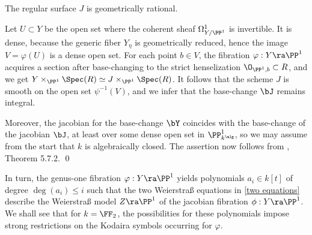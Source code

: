 \begin{proposition}
\notready
\label{jacobian geometrically rational}
The regular surface $J$ is geometrically rational.
\end{proposition}

\proof
Let $U\subset Y$ be the open set where the coherent sheaf $\Omega^1_{Y/\PP^1}$ is invertible.
It is dense, because the generic fiber $Y_\eta$ is geometrically reduced, hence the image
$V=\varphi(U)$ is a dense open set.
For each point $b\in V$, the fibration $\varphi:Y\ra\PP^1$ acquires a section after base-changing
to the strict henselization  $\O_{\PP^1,b}\subset R$, and we get $Y\times_{\PP^1}\Spec(R)\simeq J\times_{\PP^1}\Spec(R)$.
It follows that the scheme $J$ is smooth on the open set $\psi^{-1}(V)$, and we infer that the base-change $\bJ$ remains integral.

Moreover, the jacobian for the base-change $\bY$ coincides with the base-change of the jacobian $\bJ$, at least over some
dense open set in $\PP^1_{k^\alg}$, so we may assume from the start that $k$ is algebraically closed.
The assertion now follows from \cite{Cossec-Dolgachev-1989}, Theorem 5.7.2.
\qed


In turn, the genus-one fibration $\varphi:Y\ra \PP^1$ yields polynomials $a_i\in k[t]$ of degree $\deg(a_i)\leq i$
such that the two Weierstra\ss{} equations in \eqref{two equations} describe the Weierstra\ss{} model $Z\ra \PP^1$
of the jacobian fibration $\phi:Y\ra\PP^1$. We shall see that for $k=\FF_2$, the possibilities for these polynomials
impose
strong restrictions on the Kodaira symbols occurring for $\varphi$.


